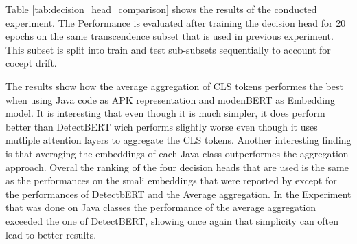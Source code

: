 Table \ref{tab:decision_head_comparison} shows the results of the conducted experiment.
The Performance is evaluated after training the decision head for 20 epochs on 
the same transcendence subset that is used in previous experiment. This subset 
is split into train and test sub-subsets sequentially to account for cocept drift.

The results show how the average aggregation of CLS tokens performes the best when
using Java code as APK representation and modenBERT as Embedding model.
It is interesting that even though it is much simpler, it does perform better than
DetectBERT wich performs slightly worse even though it uses mutliple attention
layers to aggregate the CLS tokens.
Another interesting finding is that averaging the embeddings of each Java class 
outperformes the aggregation approach. 
Overal the ranking of the four decision heads that are used is the same as the 
performances on the smali embeddings that were reported by \cite{detectbert} except
for the performances of DetectbERT and the Average aggregation. 
In the Experiment that was done on Java classes the performance of the average
aggregation exceeded the one of DetectBERT, showing once again that simplicity 
can often lead to better results.

\begin{table}[b] 
    \caption{\label{tab:decision_head_comparison}%
    Performance comparison of different decision heads on the Transcend dataset with a time-based split.}
\end{table}


